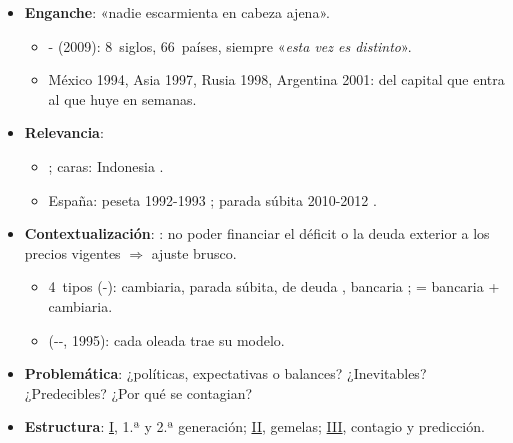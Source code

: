 \documentclass{article}
\begin{document}
\cabecerarepaso
\begin{columnas}

\begin{itemize}
\item \textbf{Enganche}: «nadie escarmienta en cabeza ajena».
  \begin{itemize}
  \item {}- (2009): 8~siglos, 66~países, siempre «\emph{esta vez es distinto}».
  \item México 1994, Asia 1997, Rusia 1998, Argentina 2001: del capital que entra al que huye en semanas.
  \end{itemize}
\item \textbf{Relevancia}:
  \begin{itemize}
  \item {}; caras: Indonesia .
  \item España: peseta 1992-1993 ; parada súbita 2010-2012 .
  \end{itemize}
\item \textbf{Contextualización}: : no poder financiar el déficit o la deuda exterior a los precios vigentes $\Rightarrow$ ajuste brusco.
  \begin{itemize}
  \item 4~tipos (-): cambiaria, parada súbita, de deuda , bancaria ;  = bancaria + cambiaria.
  \item {} (--, 1995): cada oleada trae su modelo.
  \end{itemize}
\item \textbf{Problemática}: ¿políticas, expectativas o balances? ¿Inevitables? ¿Predecibles? ¿Por qué se contagian?
\item \textbf{Estructura}: \hyperref[rep:I]{I}, 1.ª y 2.ª generación; \hyperref[rep:II]{II}, gemelas; \hyperref[rep:III]{III}, contagio y predicción.
\end{itemize}


\end{columnas}
\end{document}
